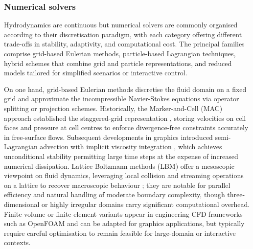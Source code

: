 
\subsubsection{Numerical solvers}

Hydrodynamics are continuous but numerical solvers are commonly organised according to their discretisation paradigm, with each category offering different trade-offs in stability, adaptivity, and computational cost. The principal families comprise grid-based Eulerian methods, particle-based Lagrangian techniques, hybrid schemes that combine grid and particle representations, and reduced models tailored for simplified scenarios or interactive control.

On one hand, grid-based Eulerian methods discretise the fluid domain on a fixed grid and approximate the incompressible Navier-Stokes equations via operator splitting or projection schemes. Historically, the Marker-and-Cell (MAC) approach established the staggered-grid representation \cite{Harlow1965}, storing velocities on cell faces and pressure at cell centres to enforce divergence-free constraints accurately in free-surface flows. Subsequent developments in graphics introduced semi-Lagrangian advection with implicit viscosity integration \cite{Stam1999}, which achieves unconditional stability permitting large time steps at the expense of increased numerical dissipation. Lattice Boltzmann methods (LBM) offer a mesoscopic viewpoint on fluid dynamics, leveraging local collision and streaming operations on a lattice to recover macroscopic behaviour \cite{Chen1998}; they are notable for parallel efficiency and natural handling of moderate boundary complexity, though three-dimensional or highly irregular domains carry significant computational overhead. Finite-volume or finite-element variants appear in engineering CFD frameworks such as OpenFOAM and can be adapted for graphics applications, but typically require careful optimisation to remain feasible for large-domain or interactive contexts. %

